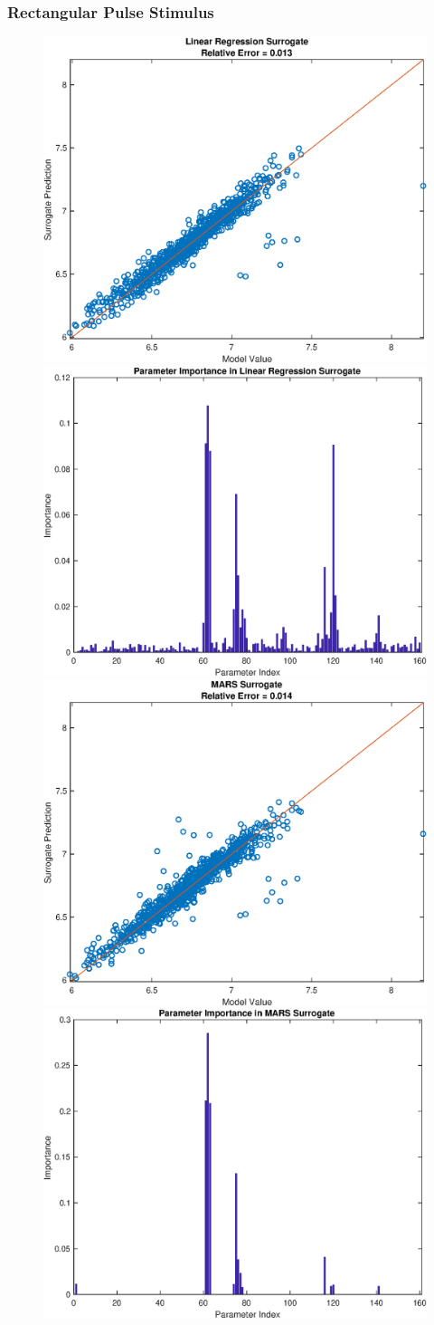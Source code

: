 \documentclass[12pt]{article}
\numberwithin{equation}{section}
\begin{document}
\subsubsection{Rectangular Pulse Stimulus}

\begin{figure}[h]
\centering
\includegraphics[width=.49 \textwidth]{Figures/K_ECS_Mean_QoI_LR_Prediction_Rectangular.eps}
\includegraphics[width=.49 \textwidth]{Figures/K_ECS_Mean_QoI_LR_VI_Rectangular.eps}\\
\includegraphics[width=.49 \textwidth]{Figures/K_ECS_Mean_QoI_MARS_Prediction_Rectangular.eps}
\includegraphics[width=.49 \textwidth]{Figures/K_ECS_Mean_QoI_MARS_VI_Rectangular.eps}
\end{figure}
\end{document}

